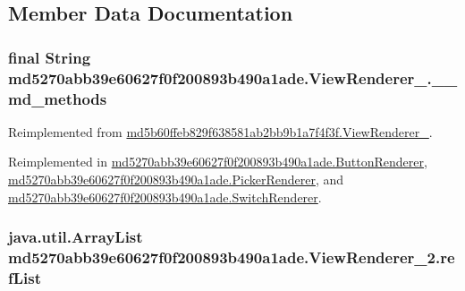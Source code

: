\subsection{Member Data Documentation}
\hypertarget{classmd5270abb39e60627f0f200893b490a1ade_1_1_view_renderer__2_c66b6f41d2afba0df6ae890c8f2b644b}{
\subsubsection[{\_\-\_\-md\_\-methods}]{\setlength{\rightskip}{0pt plus 5cm}final String {\bf md5270abb39e60627f0f200893b490a1ade.ViewRenderer\_.\_\-\_\-md\_\-methods}}}
\label{classmd5270abb39e60627f0f200893b490a1ade_1_1_view_renderer__2_c66b6f41d2afba0df6ae890c8f2b644b}




Reimplemented from \hyperlink{classmd5b60ffeb829f638581ab2bb9b1a7f4f3f_1_1_view_renderer__2_80b609e3e4054c380887d4dc2907a875}{md5b60ffeb829f638581ab2bb9b1a7f4f3f.ViewRenderer\_}.

Reimplemented in \hyperlink{classmd5270abb39e60627f0f200893b490a1ade_1_1_button_renderer_a6804b17a4e0acb62c327822a4dea5b2}{md5270abb39e60627f0f200893b490a1ade.ButtonRenderer}, \hyperlink{classmd5270abb39e60627f0f200893b490a1ade_1_1_picker_renderer_74038f85b1fb16f11210e480152a004c}{md5270abb39e60627f0f200893b490a1ade.PickerRenderer}, and \hyperlink{classmd5270abb39e60627f0f200893b490a1ade_1_1_switch_renderer_70baf7daa85c86b196cc9c27e5478a8c}{md5270abb39e60627f0f200893b490a1ade.SwitchRenderer}.\hypertarget{classmd5270abb39e60627f0f200893b490a1ade_1_1_view_renderer__2_489e61f24650a22849fddacb3f498a6b}{
\subsubsection[{refList}]{\setlength{\rightskip}{0pt plus 5cm}java.util.ArrayList {\bf md5270abb39e60627f0f200893b490a1ade.ViewRenderer\_\-2.refList}}}
\label{classmd5270abb39e60627f0f200893b490a1ade_1_1_view_renderer__2_489e61f24650a22849fddacb3f498a6b}




